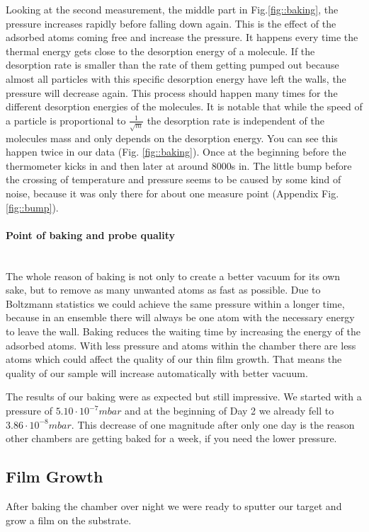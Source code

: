 \documentclass[]{article}
\begin{document}
Looking at the second measurement, the middle part in Fig.\ref{fig::baking}, the pressure increases rapidly before falling down again. This is the effect of the adsorbed atoms coming free and increase the pressure. It happens every time the thermal energy gets close to the desorption energy of a molecule. If the desorption rate is smaller than the rate of them getting pumped out because almost all particles with this specific desorption energy have left the walls, the pressure will decrease again. This process should happen many times for the different desorption energies of the molecules. It is notable that while the speed of a particle is proportional to $\frac{1}{\sqrt{m}} $ the desorption rate is independent of the molecules mass and only depends on the desorption energy.
You can see this happen twice in our data (Fig. \ref{fig::baking}). Once at the beginning before the thermometer kicks in and then later at around 8000s in. The little bump before the crossing of temperature and pressure seems to be caused by some kind of noise, because it was only there for about one measure point (Appendix Fig.\ref{fig::bump}).

\paragraph{Point of baking and probe quality} \mbox{} \\
The whole reason of baking is not only to create a better vacuum for its own sake, but to remove as many unwanted atoms as fast as possible. Due to Boltzmann statistics we could achieve the same pressure within a longer time, because in an ensemble there will always be one atom with the necessary energy to leave the wall. Baking reduces the waiting time by increasing the energy of the adsorbed atoms.
With less pressure and atoms within the chamber there are less atoms which could affect the quality of our thin film growth. That means the quality of our sample will increase automatically with better vacuum.

The results of our baking were as expected but still impressive. We started with a pressure of $5.10 \cdot 10^{-7} mbar$ and at the beginning of Day 2 we already fell to $3.86 \cdot 10^{-8} mbar $. This decrease of one magnitude after only one day is the reason other chambers are getting baked for a week, if you need the lower pressure.

\subsection{Film Growth}
After baking the chamber over night we were ready to sputter our target and grow a film on the substrate. 
\end{document}

